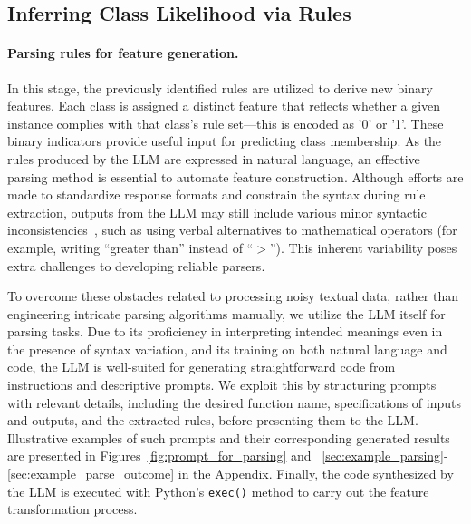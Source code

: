 \subsection{Inferring Class Likelihood via Rules}
\label{Sec:training}

\paragraph{Parsing rules for feature generation.} In this stage, the previously identified rules are utilized to derive new binary features. Each class is assigned a distinct feature that reflects whether a given instance complies with that class's rule set—this is encoded as '0' or '1'. These binary indicators provide useful input for predicting class membership. As the rules produced by the LLM are expressed in natural language, an effective parsing method is essential to automate feature construction. Although efforts are made to standardize response formats and constrain the syntax during rule extraction, outputs from the LLM may still include various minor syntactic inconsistencies~\cite{kovavc2023large}, such as using verbal alternatives to mathematical operators (for example, writing ``greater than'' instead of ``$>$''). This inherent variability poses extra challenges to developing reliable parsers.

To overcome these obstacles related to processing noisy textual data, rather than engineering intricate parsing algorithms manually, we utilize the LLM itself for parsing tasks. Due to its proficiency in interpreting intended meanings even in the presence of syntax variation, and its training on both natural language and code, the LLM is well-suited for generating straightforward code from instructions and descriptive prompts. We exploit this by structuring prompts with relevant details, including the desired function name, specifications of inputs and outputs, and the extracted rules, before presenting them to the LLM. Illustrative examples of such prompts and their corresponding generated results are presented in Figures~\ref{fig:prompt_for_parsing} and ~\ref{sec:example_parsing}-\ref{sec:example_parse_outcome} in the Appendix. Finally, the code synthesized by the LLM is executed with Python’s \texttt{exec()} method to carry out the feature transformation process.

\vspace*{-0.12in}
